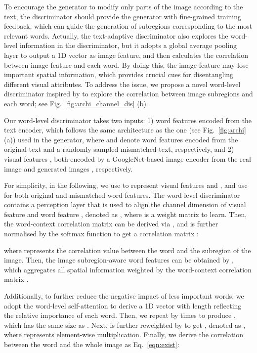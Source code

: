 \documentclass{article}
\begin{document}
To encourage the generator to modify only parts of the image according to the text, the discriminator should provide the generator with fine-grained training feedback, which can guide the generation of subregions corresponding to the most relevant words.
Actually, the text-adaptive discriminator \cite{nam2018text} also explores the word-level information in the discriminator, but it adopts a global average pooling layer to output a 1D vector as image feature, and then calculates the correlation between image feature and each word. By doing this, the image feature may lose important spatial information, which provides crucial cues for disentangling different visual attributes. 
To address the issue, we propose a novel word-level discriminator inspired by \cite{nam2018text} to explore the correlation between image subregions and each word; see Fig.~\ref{fig:archi_channel_dis} (b).

Our word-level discriminator takes two inputs: 1) word features  encoded from the text encoder, which follows the same architecture as the one (see Fig.~\ref{fig:archi} (a)) used in the generator, where  and  denote word features {encoded from} the original text  and a randomly sampled mismatched text, {respectively}, and 2) visual features , both encoded by a GoogleNet-based \cite{szegedy2015going} image encoder from the real image  and generated images , respectively. 

For simplicity, in the following, we use  to represent visual features  and , and use  for both original and mismatched word features.
The word-level discriminator contains a perception layer  that is used to align the channel dimension of visual feature  and word feature , denoted as , where  is a weight matrix to learn. Then,
the word-context correlation matrix  can be derived via , and is further normalised by the softmax function to get a correlation matrix :

where  represents the correlation value between the  word and the  subregion of the image.
Then, the image subregion-aware word features  can be obtained by , which aggregates all spatial information weighted by the word-context correlation matrix .

Additionally, to further reduce the negative impact of less important words, we adopt the word-level self-attention \cite{nam2018text} to derive a 1D vector  with length  reflecting the relative importance of each word. 
Then, we repeat  by  times to produce , which {has} the same size as .
Next,  is further reweighted by  to get , denoted as , where  represents element-wise multiplication.
Finally, we derive the correlation between the  word and the whole image as Eq.~\eqref{eqn:exist}:
\end{document}
